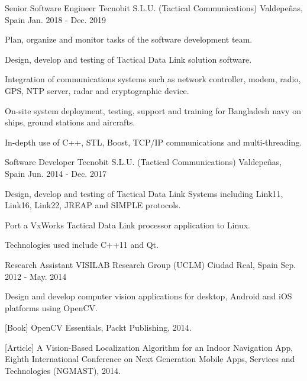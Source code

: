 \begin{cventries}
  \cventry
    {Senior Software Engineer} %
    {Tecnobit S.L.U. (Tactical Communications)} %
    {Valdepeñas, Spain} %
    {Jan. 2018 - Dec. 2019} %
    {
      \begin{cvitems} %
        \item {Plan, organize and monitor tasks of the software development team.}
        \item {Design, develop and testing of Tactical Data Link solution software.}
        \item {Integration of communications systems such as network controller, modem, radio, GPS, NTP server, radar and cryptographic device.}
        \item {On-site system deployment, testing, support and training for Bangladesh navy on ships, ground stations and aircrafts.}
        \item {In-depth use of C++, STL, Boost, TCP/IP communications and multi-threading.}
      \end{cvitems}
    }

  \cventry
    {Software Developer} %
    {Tecnobit S.L.U. (Tactical Communications)} %
    {Valdepeñas, Spain} %
    {Jun. 2014 - Dec. 2017} %
    {
      \begin{cvitems} %
        \item {Design, develop and testing of Tactical Data Link Systems including Link11, Link16, Link22, JREAP and SIMPLE protocols.}
        \item {Port a VxWorks Tactical Data Link processor application to Linux.}
        \item {Technologies used include C++11 and Qt.}
      \end{cvitems}
    }


  \cventry
    {Research Assistant} %
    {VISILAB Research Group (UCLM)} %
    {Ciudad Real, Spain} %
    {Sep. 2012 - May. 2014} %
    {
      \begin{cvitems} %
        \item {Design and develop computer vision applications for desktop, Android and iOS platforms using OpenCV.}
        \item {[Book] OpenCV Essentials, Packt Publishing, 2014.}
        \item {[Article] A Vision-Based Localization Algorithm for an Indoor Navigation App, Eighth International Conference on Next Generation Mobile Apps, Services and Technologies (NGMAST), 2014.}
      \end{cvitems}
    }




\end{cventries}
